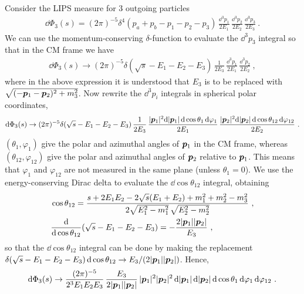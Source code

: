 Consider the LIPS measure for 3 outgoing particles
\begin{align}
    \dd \Phi_3 (s) = 
    (2\pi)^{-5}
    \delta^4(p_a + p_b - p_1 - p_2 - p_3)
    \, \frac{\dd^3 p_1}{2 E_1} 
    \, \frac{\dd^3 p_2}{2 E_2}
    \, \frac{\dd^3 p_3}{2 E_3} \ .
\end{align}
We can use the momentum-conserving $\delta$-function to evaluate the $\dd^3 p_3$ integral so that in the CM frame we have
\begin{align}
    \dd \Phi_3 (s) \rightarrow
    (2\pi)^{-5}
    \delta(\sqrt{s} - E_1 - E_2 - E_3)
    \, \frac{1}{2 E_3} 
    \, \frac{\dd^3 p_1}{2 E_1} 
    \, \frac{\dd^3 p_2}{2 E_2} \ ,
\end{align}
where in the above expression it is understood that $E_3$ is to be replaced with $\sqrt{(-\pvec[1] - \pvec[2])^2 + m_3^2}$.
Now rewrite the $\dd^3 p_i$ integrals in spherical polar coordinates, 
\begin{align}
    \dd \Phi_3 (s) \rightarrow
    (2\pi)^{-5}
    \delta(\sqrt{s} - E_1 - E_2 - E_3)
    \, \frac{1}{2 E_3} 
    \, \frac{|\pvec[1]|^2 \dd |\pvec[1]| \, \dd \cos \theta_1 \, \dd \varphi_1}{2 E_1} 
    \, \frac{|\pvec[2]|^2 \dd |\pvec[2]| \, \dd \cos \theta_{12} \, \dd \varphi_{12}}{2 E_2} \ .
\end{align}
$(\theta_{1}, \varphi_{1})$ give the polar and azimuthal angles of $\pvec[1]$ in the CM frame, whereas $(\theta_{12}, \varphi_{12})$ give the polar and azimuthal angles of $\pvec[2]$ relative to $\pvec[1]$. 
This means that $\varphi_1$ and $\varphi_{12}$ are not measured in the same plane (unless $\theta_1 = 0$).
We use the energy-conserving Dirac delta to evaluate the $\dd \cos \theta_{12}$ integral, obtaining
\begin{align}
    &\cos \theta_{12} =
    \frac{s + 2 E_1 E_2 - 2 \sqrt{s}(E_1 + E_2) + m_1^2 + m_2^2 - m_3^2}{2 \sqrt{E_1^2 - m_1^2} \, \sqrt{E_2^2 - m_2^2}} \  , \\
    &\frac{\dd}{\dd \cos\theta_{12}} (\sqrt{s} - E_1 - E_2 - E_3) = - \frac{2 |\pvec[1]| |\pvec[2]|}{E_3} \ , 
\end{align} 
so that the $\dd \cos \theta_{12}$ integral can be done by making the replacement $\delta(\sqrt{s} - E_1 - E_2 - E_3) \, \dd \cos \theta_{12} \rightarrow E_3 / (2 |\pvec[1]| |\pvec[2]|)$.
Hence,
\begin{equation}
    \dd \Phi_3 (s) \rightarrow 
    \frac{(2\pi)^{-5}}{2^3 E_1 E_2 E_3} 
    \, \frac{E_3}{2 |\pvec[1]| |\pvec[2]|} 
    \, |\pvec[1]|^2 |\pvec[2]|^2
    \, \dd |\pvec[1]| \, \dd |\pvec[2]| 
    \, \dd \cos \theta_1 \, \dd \varphi_1 
    \, \dd \varphi_{12} \ .
\end{equation}
